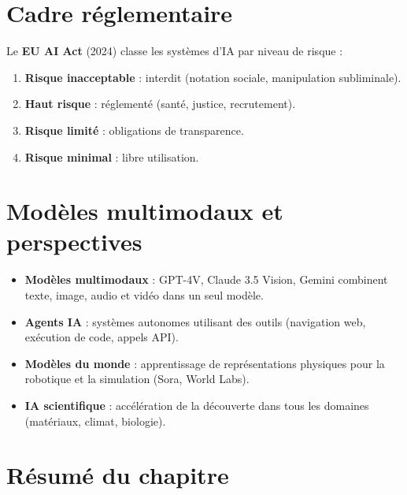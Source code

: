 \section{Cadre r\'eglementaire}
\label{sec:regulation}

Le \textbf{EU AI Act} (2024) classe les syst\`emes d'IA par niveau de risque :
\begin{enumerate}
\item \textbf{Risque inacceptable} : interdit (notation sociale, manipulation subliminale).
\item \textbf{Haut risque} : r\'eglement\'e (sant\'e, justice, recrutement).
\item \textbf{Risque limit\'e} : obligations de transparence.
\item \textbf{Risque minimal} : libre utilisation.
\end{enumerate}

\section{Mod\`eles multimodaux et perspectives}
\label{sec:multimodal}

\begin{sota}
\begin{itemize}
\item \textbf{Mod\`eles multimodaux} : GPT-4V, Claude 3.5 Vision, Gemini combinent texte, image, audio et vid\'eo dans un seul mod\`ele.
\item \textbf{Agents IA} : syst\`emes autonomes utilisant des outils (navigation web, ex\'ecution de code, appels API).
\item \textbf{Mod\`eles du monde} : apprentissage de repr\'esentations physiques pour la robotique et la simulation (Sora, World Labs).
\item \textbf{IA scientifique} : acc\'el\'eration de la d\'ecouverte dans tous les domaines (mat\'eriaux, climat, biologie).
\end{itemize}
\end{sota}

\section{R\'esum\'e du chapitre}

